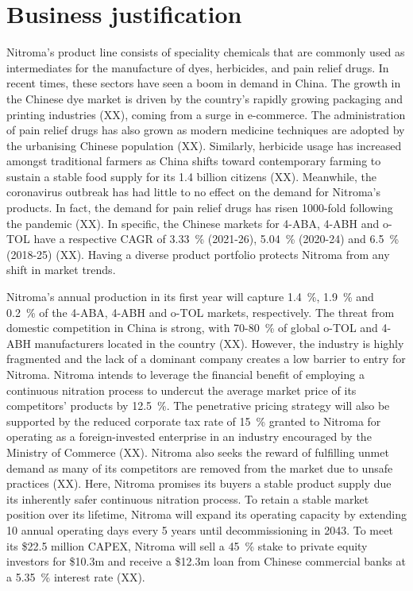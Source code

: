 \section*{Business justification}

Nitroma’s product line consists of speciality chemicals that are commonly used as intermediates for the manufacture of dyes, herbicides, and pain relief drugs. In recent times, these sectors have seen a boom in demand in China. The growth in the Chinese dye market is driven by the country’s rapidly growing packaging and printing industries (XX), coming from a surge in e-commerce. The administration of pain relief drugs has also grown as modern medicine techniques are adopted by the urbanising Chinese population (XX). Similarly, herbicide usage has increased amongst traditional farmers as China shifts toward contemporary farming to sustain a stable food supply for its 1.4 billion citizens (XX). Meanwhile, the coronavirus outbreak has had little to no effect on the demand for Nitroma’s products. In fact, the demand for pain relief drugs has risen 1000-fold following the pandemic (XX). In specific, the Chinese markets for 4-ABA, 4-ABH and o-TOL have a respective CAGR of \SI{3.33}{\percent} (2021-26), \SI{5.04}{\percent} (2020-24) and \SI{6.5}{\percent} (2018-25) (XX). Having a diverse product portfolio protects Nitroma from any shift in market trends.

Nitroma’s annual production in its first year will capture \SI{1.4}{\percent}, \SI{1.9}{\percent} and \SI{0.2}{\percent} of the 4-ABA, 4-ABH and o-TOL markets, respectively. The threat from domestic competition in China is strong, with 70-\SI{80}{\percent} of global o-TOL and 4-ABH manufacturers located in the country (XX). However, the industry is highly fragmented and the lack of a dominant company creates a low barrier to entry for Nitroma. Nitroma intends to leverage the financial benefit of employing a continuous nitration process to undercut the average market price of its competitors’ products by \SI{12.5}{\percent}.  The penetrative pricing strategy will also be supported by the reduced corporate tax rate of \SI{15}{\percent} granted to Nitroma for operating as a foreign-invested enterprise in an industry encouraged by the Ministry of Commerce (XX). Nitroma also seeks the reward of fulfilling unmet demand as many of its competitors are removed from the market due to unsafe practices (XX). Here, Nitroma promises its buyers a stable product supply due its inherently safer continuous nitration process. To retain a stable market position over its lifetime, Nitroma will expand its operating %
capacity by extending 10 annual operating days every 5 years until decommissioning in 2043. 
To meet its \$22.5 million CAPEX, Nitroma will sell a \SI{45}{\percent} stake to private equity investors for \$10.3m and receive a \$12.3m loan from Chinese commercial banks at a \SI{5.35}{\percent} interest rate (XX).

